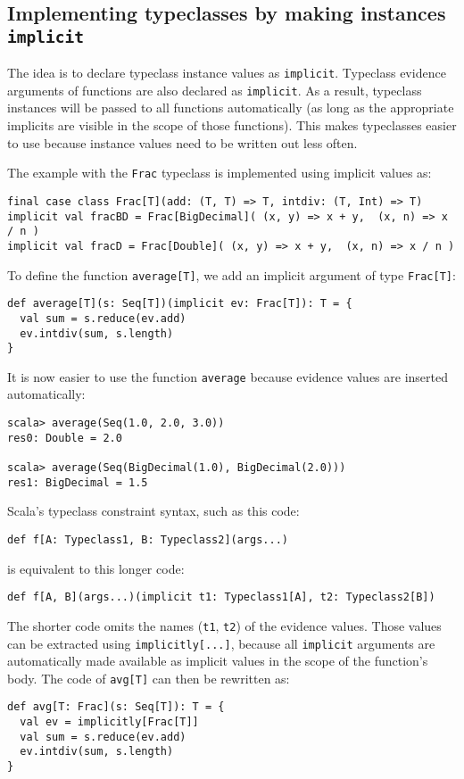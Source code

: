 \subsection{Implementing typeclasses by making instances \texttt{implicit} }

The idea is to declare typeclass instance values as \lstinline!implicit!.
Typeclass evidence arguments of functions are also declared as \lstinline!implicit!.
As a result, typeclass instances will be passed to all functions automatically
(as long as the appropriate implicits are visible in the scope of
those functions). This makes typeclasses easier to use because instance
values need to be written out less often.

The example with the \lstinline!Frac! typeclass is implemented using
implicit values as:
\begin{lstlisting}
final case class Frac[T](add: (T, T) => T, intdiv: (T, Int) => T)
implicit val fracBD = Frac[BigDecimal]( (x, y) => x + y,  (x, n) => x / n )
implicit val fracD = Frac[Double]( (x, y) => x + y,  (x, n) => x / n )
\end{lstlisting}
To define the function \lstinline!average[T]!, we add an implicit
argument of type \lstinline!Frac[T]!:
\begin{lstlisting}
def average[T](s: Seq[T])(implicit ev: Frac[T]): T = {
  val sum = s.reduce(ev.add)
  ev.intdiv(sum, s.length)
}
\end{lstlisting}
It is now easier to use the function \lstinline!average! because
evidence values are inserted automatically:
\begin{lstlisting}
scala> average(Seq(1.0, 2.0, 3.0))
res0: Double = 2.0

scala> average(Seq(BigDecimal(1.0), BigDecimal(2.0)))
res1: BigDecimal = 1.5
\end{lstlisting}

Scala\textsf{'}s typeclass constraint syntax, such as this code: 
\begin{lstlisting}
def f[A: Typeclass1, B: Typeclass2](args...)
\end{lstlisting}
is equivalent to this longer code:
\begin{lstlisting}
def f[A, B](args...)(implicit t1: Typeclass1[A], t2: Typeclass2[B])
\end{lstlisting}
The shorter code omits the names (\lstinline!t1!, \lstinline!t2!)
of the evidence values. Those values can be extracted using \lstinline!implicitly[...]!,
because all \lstinline!implicit! arguments are automatically made
available as implicit values in the scope of the function\textsf{'}s body.
The code of \lstinline!avg[T]! can then be rewritten as:
\begin{lstlisting}
def avg[T: Frac](s: Seq[T]): T = {
  val ev = implicitly[Frac[T]]
  val sum = s.reduce(ev.add)
  ev.intdiv(sum, s.length)
}
\end{lstlisting}

